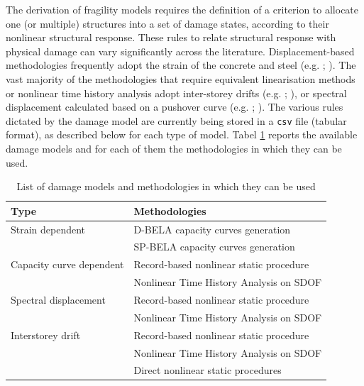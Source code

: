 The derivation of fragility models requires the definition of a criterion to allocate one (or multiple) structures into a set of damage states, according to their nonlinear structural response. These rules to relate structural response with physical damage can vary significantly across the literature. Displacement-based methodologies frequently adopt the strain of the concrete and steel (e.g. \cite{BorziEtAl2008b}; \cite{SilvaEtAl2013}). The vast majority of the methodologies that require equivalent linearisation methods or nonlinear time history analysis adopt inter-storey drifts (e.g. \cite{VamvatsikosCornell2005}; \cite{RossettoElnashai2005}), or spectral displacement calculated based on a pushover curve (e.g. \cite{Erberik2008}; \cite{SilvaEtAl2014c}). The various rules dictated by the damage model are currently being stored in a \verb=csv= file (tabular format), as described below for each type of model. Tabel \ref{table:dmg_list} reports the available damage models and for each of them the methodologies in which they can be used.

\begin {table}[!htbp]
\caption{List of damage models and methodologies in which they can be used}
\label{table:dmg_list}
\begin{center}
  \begin{tabular}{|l|l|}\hline
\textbf{Type} & \textbf{Methodologies} \\ \hline
Strain dependent & D-BELA capacity curves generation\\ 
							& SP-BELA capacity curves generation\\ \hline
Capacity curve dependent &  Record-based nonlinear static procedure\\ 
										& Nonlinear Time History Analysis on SDOF\\ \hline
Spectral displacement &  Record-based nonlinear static procedure\\ 
										& Nonlinear Time History Analysis on SDOF\\ \hline
Interstorey drift & Record-based nonlinear static procedure\\ 
						& Nonlinear Time History Analysis on SDOF\\
						& Direct nonlinear static procedures\\ \hline
  \end{tabular}
\end{center}
\end{table}

